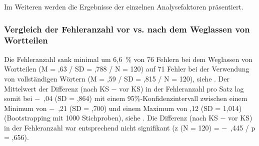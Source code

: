 
Im Weiteren werden die Ergebnisse der einzelnen Analysefaktoren präsentiert.

\subsubsection{Vergleich der Fehleranzahl vor vs. nach dem Weglassen von Wortteilen}
\label{sec:5.3.9.1}

Die Fehleranzahl sank minimal um 6,6~\% von 76 Fehlern bei dem Weglassen von Wortteilen (M = ,63 / SD = ,788 / N = 120) auf 71 Fehler bei der Verwendung von vollständigen Wörtern (M = ,59 / SD = ,815 / N = 120), siehe . Der Mittelwert der Differenz (nach KS $-$ vor KS) in der Fehleranzahl pro Satz lag somit bei $-$~,04 (SD = ,864) mit einem 95\%\nobreakdash-Konfidenzintervall zwischen einem Minimum von $-$~,21 (SD = ,700) und einem Maximum von ,12 (SD = 1,014) (Bootstrapping mit 1000 Stichproben), siehe . Die Differenz (nach KS $-$ vor KS) in der Fehleranzahl war entsprechend nicht signifikant (z (N = 120) = $-$~,445 / p = ,656).


